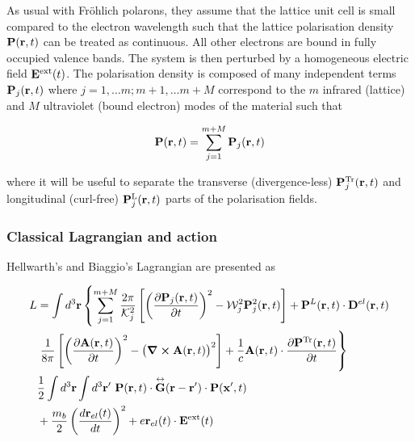 As usual with Fr\"ohlich polarons, they assume that the lattice unit cell is small compared to the electron wavelength such that the lattice polarisation density $\vb{P}(\vb{r}, t)$ can be treated as continuous. All other electrons are bound in fully occupied valence bands. The system is then perturbed by a homogeneous electric field $\vb{E}^{\text{ext}}(t)$. The polarisation density is composed of many independent terms $\vb{P}_j(\vb{r}, t)$ where $j = 1, \dots m; m + 1, \dots m + M$ correspond to the $m$ infrared (lattice) and $M$ ultraviolet (bound electron) modes of the material such that

\begin{equation}
    \vb{P}(\vb{r}, t) = \sum_{j = 1}^{m + M} \vb{P}_j(\vb{r}, t)
\end{equation}

where it will be useful to separate the transverse (divergence-less) $\vb{P}_j^{\text{Tr}}(\vb{r}, t)$ and longitudinal (curl-free) $\vb{P}_j^{\text{L}}(\vb{r}, t)$ parts of the polarisation fields.

\subsubsection{Classical Lagrangian and action}
\label{subsubsec:2-3-3-1}

Hellwarth's and Biaggio's Lagrangian are presented as

\begin{equation} \label{eqn:hi_lag}
    \begin{aligned}
        L &= \int d^3 \vb{r} \left\{ \sum_{j = 1}^{m+M} \frac{2\pi}{\mathcal{K}_j^2} \left[ \left( \frac{\partial \vb{P}_j(\vb{r}, t)}{\partial t} \right)^2 - \mathcal{W}_j^2 \vb{P}_j^2(\vb{r}, t)\right] + \vb{P}^L(\vb{r}, t) \cdot \vb{D}^{el}(\vb{r}, t) \right. \\
        &\left. \frac{1}{8\pi} \left[ \left( \frac{\partial \vb{A}(\vb{r}, t)}{\partial t} \right)^2 - \left( \curl{\vb{A}(\vb{r}, t)} \right)^2 \right] + \frac{1}{c} \vb{A}(\vb{r}, t) \cdot \frac{\partial \vb{P}^{\text{Tr}}(\vb{r}, t)}{\partial t} \right\} \\
        &\frac{1}{2} \int d^3\vb{r} \int d^3\vb{r'}\ \vb{P}(\vb{r}, t) \cdot \overset{\leftrightarrow}{\vb{G}}(\vb{r} - \vb{r'}) \cdot \vb{P}(\vb{x'}, t) \\
        &+\frac{m_b}{2} \left( \frac{d \vb{r}_{el}(t)}{dt} \right)^2 + e \vb{r}_{el}(t) \cdot \vb{E}^{\text{ext}}(t)
    \end{aligned}
\end{equation}


